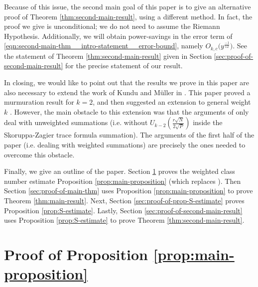 \documentclass[12pt,letterpaper,reqno]{amsart}
\theoremstyle{plain}
\theoremstyle{definition}
\numberwithin{equation}{section}
\numberwithin{figure}{section}
\numberwithin{table}{section}
\newcommand{\lrp}[1]{\!\left(#1\right)}
\begin{document}
Because of this issue, the second main goal of this paper is to give an alternative proof of Theorem \ref{thm:second-main-result}, using a different method. In fact, the proof we give is unconditional; we do not need to assume the Riemann Hypothesis. Additionally, we will obtain power-savings in the error term of \eqref{eqn:second-main-thm__intro-statement__error-bound}, namely $O_{k,c}\big(y^{\frac{-1}{12}}\big)$. See the statement of Theorem \ref{thm:second-main-result} given in Section \ref{sec:proof-of-second-main-result} for the precise statement of our result.


In closing, we would like to point out that the results we prove in this paper are also necessary to extend the work of Kundu and M\"uller in \cite{kundu-muller}. This paper proved a murmuration result for $k=2$, and then suggested an extension to general weight $k$ \cite[Subsection 1.1]{kundu-muller}. However, the main obstacle to this extension was that the arguments of \cite{kundu-muller} only deal with unweighted summations (i.e. without $U_{k-2} \lrp{\frac{r\sqrt{N}}{2\sqrt P}}$ inside the Skoruppa-Zagier trace formula summation). The arguments of the first half of the paper (i.e. dealing with weighted summations) are precisely the ones needed to overcome this obstacle. 


Finally, we give an outline of the paper. Section \ref{sec:proof-of-main-prop} proves the weighted class number estimate Proposition \ref{prop:main-proposition} (which replaces \cite[Proposition 3.2]{Zubrilina}). Then Section \ref{sec:proof-of-main-thm} uses Proposition \ref{prop:main-proposition} to prove Theorem \ref{thm:main-result}. Next, Section \ref{sec:proof-of-prop-S-estimate} proves Proposition \ref{prop:S-estimate}. Lastly, Section \ref{sec:proof-of-second-main-result} uses Proposition \ref{prop:S-estimate} to prove Theorem \ref{thm:second-main-result}.








\section{Proof of Proposition \ref{prop:main-proposition}} \label{sec:proof-of-main-prop}
\end{document}
